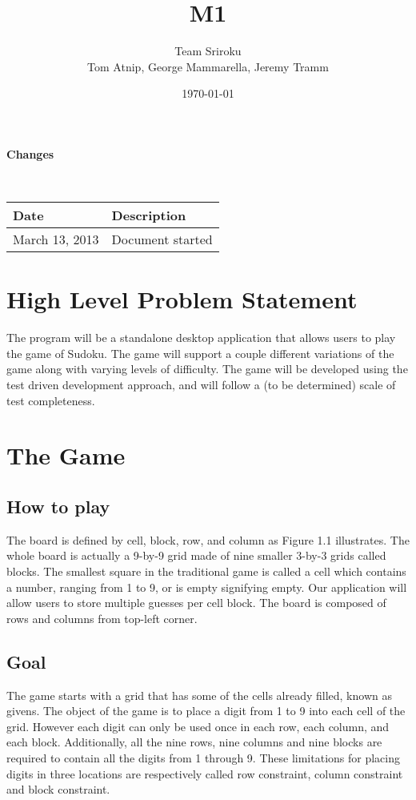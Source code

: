 \documentclass{article}
\begin{document}
\setlength{\voffset}{3.5in}
\title{M1}
\author{\Large Team Sriroku\\
Tom Atnip, George Mammarella, Jeremy Tramm}
\date{\today}
\maketitle
\clearpage
\setlength{\voffset}{0pt}
\tableofcontents
\clearpage


\begin{Large}
\textbf{Changes}
\end{Large}
\\

\begin{tabular}{ | p{1.5in} | p{4.5in} | }
\hline
\textbf{Date} & \textbf{Description}\\
\hline
\hline
March 13, 2013 & Document started\\
\hline
\end{tabular}
\clearpage

\section{High Level Problem Statement}
The program will be a standalone desktop application that allows users to play the game of Sudoku. The game will support a couple different variations of the game along with varying levels of difficulty. The game will be developed using the test driven development approach, and will follow a (to be determined) scale of test completeness. 

\section{The Game}
\subsection{How to play}
The board is defined by cell, block, row, and column as Figure 1.1 illustrates. The whole board is actually a 9-by-9 grid made of nine smaller 3-by-3 grids called blocks. The smallest square in the traditional game is called a cell which contains a number, ranging from 1 to 9, or is empty signifying empty. Our application will allow users to store multiple guesses per cell block. The board is composed of rows and columns from top-left corner.

\subsection{Goal}
The game starts with a grid that has some of the cells already filled, known as givens. The object of the game is to place a digit from 1 to 9 into each cell of the grid. However each digit can only be used once in each row, each column, and each block. Additionally, all the nine rows, nine columns and nine blocks are required to contain all the digits from 1 through 9. These limitations for placing digits in three locations are respectively called row constraint, column constraint and block constraint.
\end{document}
